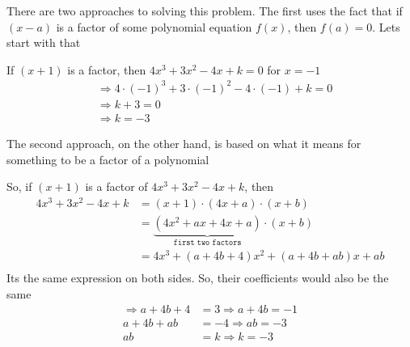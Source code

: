 \begin{solution}[\halfpage]
	There are two approaches to solving this problem. The first uses the fact
	that if $(x-a)$ is a factor of some polynomial equation $f(x)$, then $f(a) = 0$.
	Lets start with that
	
	If $(x+1)$ is a factor, then $4x^3+3x^2-4x+k = 0 $ for $x = -1$
	\begin{align}
		& \Rightarrow 4\cdot(-1)^3+3\cdot(-1)^2-4\cdot(-1)+k = 0 \\
		& \Rightarrow k + 3 = 0 \\
		& \Rightarrow k = -3
	\end{align}
	
	The second approach, on the other hand, is based on what it means for something  
	to be a factor of a polynomial
	
	So, if $(x+1)$ is a factor of $4x^3+3x^2-4x+k$, then 
	\begin{align}
		4x^3+3x^2-4x+k &= (x+1)\cdot(4x+a)\cdot(x+b) \\
					   &= \underbrace{(4x^2+ax+4x+a)}_\texttt{first two factors}\cdot(x+b) \\
					   &= 4x^3+(a+4b+4)x^2+(a+4b+ab)x+ab \\
	\end{align}	 
	Its the same expression on both sides. So, their coefficients would also be the same
	\begin{align}
		\Rightarrow a+4b+4 &= 3 \Rightarrow a + 4b = -1\\
		            a+4b+ab &= -4 \Rightarrow ab = -3\\
		            ab &= k \Rightarrow k = -3
	\end{align}
	
\end{solution}
